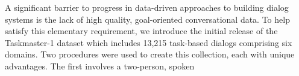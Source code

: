 A significant barrier to progress in data-driven approaches to building dialog systems is the lack of high quality, goal-oriented conversational data. To help satisfy this elementary requirement, we introduce the initial release of the Taskmaster-1 dataset which includes 13,215 task-based dialogs comprising six domains. Two procedures were used to create this collection, each with unique advantages. The first involves a two-person, spoken